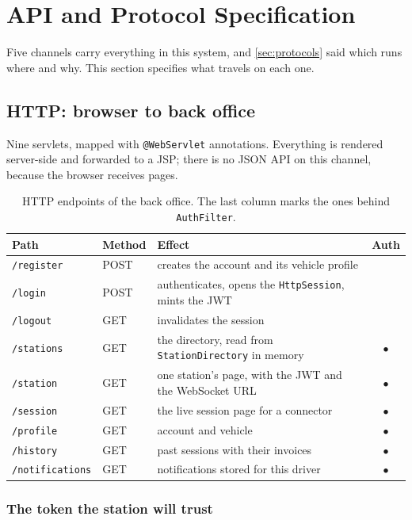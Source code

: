\section{API and Protocol Specification}
\label{sec:api}

Five channels carry everything in this system, and \cref{sec:protocols} said which runs where
and why. This section specifies what travels on each one.

\subsection{HTTP: browser to back office}
\label{sec:api-http}

Nine servlets, mapped with \texttt{@WebServlet} annotations.
Everything is rendered server-side and forwarded to a JSP; there is no JSON API on this
channel, because the browser receives pages.

\begin{table}[h]
\centering\small
\renewcommand{\arraystretch}{1.15}
\caption{HTTP endpoints of the back office. The last column marks the ones behind
\texttt{AuthFilter}.}
\label{tab:http}
\begin{tabularx}{\textwidth}{@{}l l X c@{}}
\toprule
Path & Method & Effect & Auth \\
\midrule
\texttt{/register} & POST & creates the account and its vehicle profile & \\
\texttt{/login} & POST & authenticates, opens the \texttt{HttpSession}, mints the JWT & \\
\texttt{/logout} & GET & invalidates the session & \\
\texttt{/stations} & GET & the directory, read from \texttt{StationDirectory} in memory &
  $\bullet$ \\
\texttt{/station} & GET & one station's page, with the JWT and the WebSocket URL &
  $\bullet$ \\
\texttt{/session} & GET & the live session page for a connector & $\bullet$ \\
\texttt{/profile} & GET & account and vehicle & $\bullet$ \\
\texttt{/history} & GET & past sessions with their invoices & $\bullet$ \\
\texttt{/notifications} & GET & notifications stored for this driver & $\bullet$ \\
\bottomrule
\end{tabularx}
\end{table}

\subsubsection{The token the station will trust}
\label{sec:api-jwt}

